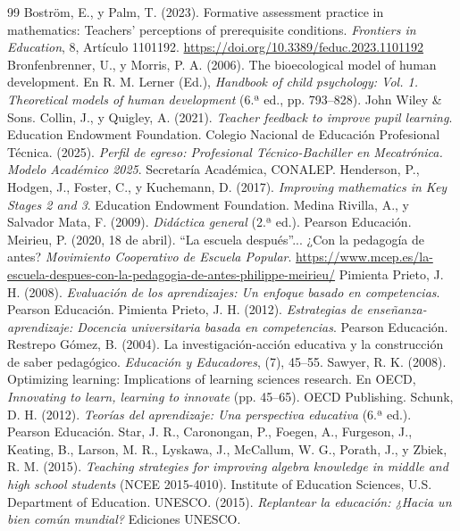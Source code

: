 \documentclass[spanish,letterpaper,oneside]{article}
\begin{document}
\clearpage
\begin{thebibliography}{99}
 Boström, E., y Palm, T. (2023). Formative assessment practice in mathematics: Teachers' perceptions of prerequisite conditions. \textit{Frontiers in Education}, 8, Artículo 1101192. \url{https://doi.org/10.3389/feduc.2023.1101192}
 Bronfenbrenner, U., y Morris, P. A. (2006). The bioecological model of human development. En R. M. Lerner (Ed.), \textit{Handbook of child psychology: Vol. 1. Theoretical models of human development} (6.ª ed., pp. 793--828). John Wiley \& Sons.
 Collin, J., y Quigley, A. (2021). \textit{Teacher feedback to improve pupil learning}. Education Endowment Foundation.
 Colegio Nacional de Educación Profesional Técnica. (2025). \textit{Perfil de egreso: Profesional Técnico-Bachiller en Mecatrónica. Modelo Académico 2025}. Secretaría Académica, CONALEP.
 Henderson, P., Hodgen, J., Foster, C., y Kuchemann, D. (2017). \textit{Improving mathematics in Key Stages 2 and 3}. Education Endowment Foundation.
 Medina Rivilla, A., y Salvador Mata, F. (2009). \textit{Didáctica general} (2.ª ed.). Pearson Educación.
 Meirieu, P. (2020, 18 de abril). ``La escuela después''... ¿Con la pedagogía de antes? \textit{Movimiento Cooperativo de Escuela Popular}. \url{https://www.mcep.es/la-escuela-despues-con-la-pedagogia-de-antes-philippe-meirieu/}
 Pimienta Prieto, J. H. (2008). \textit{Evaluación de los aprendizajes: Un enfoque basado en competencias}. Pearson Educación.
 Pimienta Prieto, J. H. (2012). \textit{Estrategias de enseñanza-aprendizaje: Docencia universitaria basada en competencias}. Pearson Educación.
 Restrepo Gómez, B. (2004). La investigación-acción educativa y la construcción de saber pedagógico. \textit{Educación y Educadores}, (7), 45--55.
 Sawyer, R. K. (2008). Optimizing learning: Implications of learning sciences research. En OECD, \textit{Innovating to learn, learning to innovate} (pp. 45--65). OECD Publishing.
 Schunk, D. H. (2012). \textit{Teorías del aprendizaje: Una perspectiva educativa} (6.ª ed.). Pearson Educación.
 Star, J. R., Caronongan, P., Foegen, A., Furgeson, J., Keating, B., Larson, M. R., Lyskawa, J., McCallum, W. G., Porath, J., y Zbiek, R. M. (2015). \textit{Teaching strategies for improving algebra knowledge in middle and high school students} (NCEE 2015-4010). Institute of Education Sciences, U.S. Department of Education.
 UNESCO. (2015). \textit{Replantear la educación: ¿Hacia un bien común mundial?} Ediciones UNESCO.
\end{thebibliography}
\end{document}
